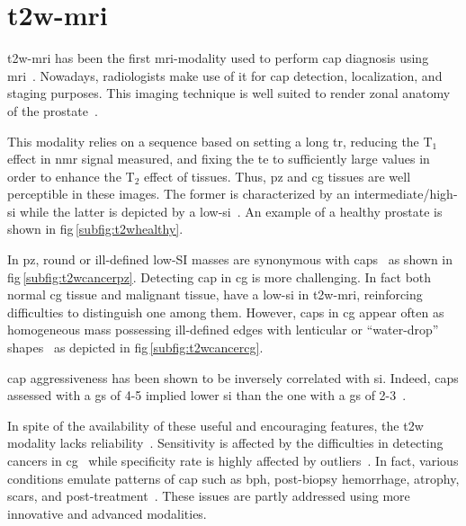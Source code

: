 \section{\acs*{t2w}-\acs*{mri}}\label{subsec:chp2:imaging:t2w} 
\ac{t2w}-\ac{mri} has been the first \ac{mri}-modality used to perform \ac{cap} diagnosis using \ac{mri}~\cite{Hricak1983}.
Nowadays, radiologists make use of it for \ac{cap} detection, localization, and staging purposes.
This imaging technique is well suited to render zonal anatomy of the prostate~\cite{Barentsz2012}. 

This modality relies on a sequence based on setting a long \ac{tr}, reducing the T$_{1}$ effect in \ac{nmr} signal measured, and fixing the \ac{te} to sufficiently large values in order to enhance the T$_{2}$ effect of tissues.
Thus, \ac{pz} and \ac{cg} tissues are well perceptible in these images.
The former is characterized by an intermediate/high-\ac{si} while the latter is depicted by a low-\ac{si}~\cite{Hricak1987}.
An example of a healthy prostate is shown in \acs{fig}\,\ref{subfig:t2whealthy}.

In \ac{pz}, round or ill-defined low-SI masses are synonymous with \acp{cap}~\cite{Hricak1983} as shown in \acs{fig}\,\ref{subfig:t2wcancerpz}.
Detecting \ac{cap} in \ac{cg} is more challenging.
In fact both normal \ac{cg} tissue and malignant tissue, have a low-\ac{si} in \ac{t2w}-\ac{mri}, reinforcing difficulties to distinguish one among them.
However, \acp{cap} in \ac{cg} appear often as homogeneous mass possessing ill-defined edges with lenticular or ``water-drop'' shapes~\cite{Akin2006,Barentsz2012} as depicted in \acs{fig}\,\ref{subfig:t2wcancercg}. 

\ac{cap} aggressiveness has been shown to be inversely correlated with \ac{si}.
Indeed, \acp{cap} assessed with a \ac{gs} of 4-5 implied lower \ac{si} than the one with a \ac{gs} of 2-3~\cite{Wang2008}.

In spite of the availability of these useful and encouraging features, the \ac{t2w} modality lacks reliability~\cite{Kirkham2006,Hoeks2011}.
Sensitivity is affected by the difficulties in detecting cancers in \ac{cg}~\cite{Kirkham2006} while specificity rate is highly affected by outliers~\cite{Barentsz2012}.
In fact, various conditions emulate patterns of \ac{cap} such as \ac{bph}, post-biopsy hemorrhage, atrophy, scars, and post-treatment~\cite{Hricak1987,Quint1991,Scheidler1999,Cruz2002,Barentsz2012}.
These issues are partly addressed using more innovative and advanced modalities.

